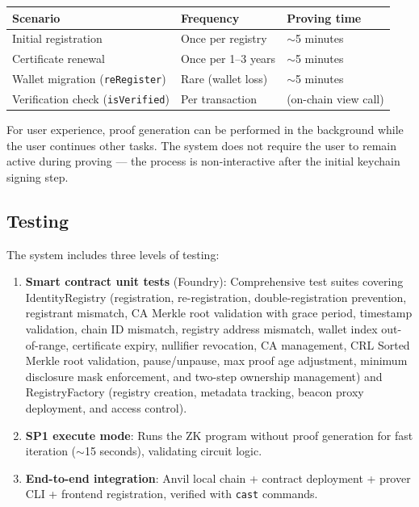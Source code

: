 \documentclass[11pt, a4paper]{article}
\providecommand{\tightlist}{%
  \setlength{\itemsep}{0pt}\setlength{\parskip}{0pt}}
\begin{document}
\begin{longtable}[]{@{}
  >{\raggedright\arraybackslash}p{}
  >{\raggedright\arraybackslash}p{}
  >{\raggedright\arraybackslash}p{}@{}}
\toprule\noalign{}
\begin{minipage}[b]{\linewidth}\raggedright
Scenario
\end{minipage} & \begin{minipage}[b]{\linewidth}\raggedright
Frequency
\end{minipage} & \begin{minipage}[b]{\linewidth}\raggedright
Proving time
\end{minipage} \\
\midrule\noalign{}
\endhead
\bottomrule\noalign{}
\endlastfoot
Initial registration & Once per registry & $\sim$5 minutes \\
Certificate renewal & Once per 1--3 years & $\sim$5 minutes \\
Wallet migration (\texttt{reRegister}) & Rare (wallet loss) &
$\sim$5 minutes \\
Verification check (\texttt{isVerified}) & Per transaction & 0 (on-chain
view call) \\
\end{longtable}

For user experience, proof generation can be performed in the background
while the user continues other tasks. The system does not require the
user to remain active during proving --- the process is non-interactive
after the initial keychain signing step.

\subsection{Testing}\label{testing}

The system includes three levels of testing:

\begin{enumerate}
\def\labelenumi{\arabic{enumi}.}
\tightlist
\item
  \textbf{Smart contract unit tests} (Foundry): Comprehensive test suites
  covering IdentityRegistry (registration, re-registration,
  double-registration prevention, registrant mismatch, CA Merkle root
  validation with grace period, timestamp validation, chain ID mismatch,
  registry address mismatch, wallet index out-of-range, certificate
  expiry, nullifier revocation, CA management, CRL Sorted Merkle root
  validation, pause/unpause, max proof age adjustment, minimum
  disclosure mask enforcement, and two-step ownership management) and
  RegistryFactory (registry creation, metadata tracking, beacon proxy
  deployment, and access control).
\item
  \textbf{SP1 execute mode}: Runs the ZK program without proof
  generation for fast iteration ($\sim$15 seconds), validating
  circuit logic.
\item
  \textbf{End-to-end integration}: Anvil local chain + contract
  deployment + prover CLI + frontend registration, verified with
  \texttt{cast} commands.
\end{enumerate}
\end{document}

